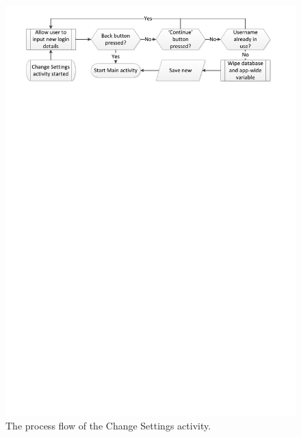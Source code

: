 \begin{figure}
 \centering 
 \includegraphics[clip = true, trim = 0 680 0 20,
 scale=0.7]{change_settings_processflow}
 \caption{The process flow of the Change Settings activity.}
 \label{fig:change-user-settings}
\end{figure}

